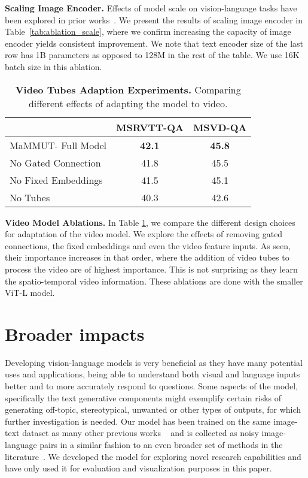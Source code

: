 \documentclass[10pt]{article} \usepackage[accepted]{tmlr}
\newcommand{\tablestyle}[2]{\setlength{\tabcolsep}{#1}\renewcommand{\arraystretch}{#2}\centering\footnotesize}
\newcommand{\ours}{MaMMUT\xspace}
\begin{document}
\textbf{Scaling Image Encoder.}
Effects of model scale on vision-language tasks have been explored in prior works~\citep{flamingo,pali}. We present the results of scaling image encoder in Table~\ref{tab:ablation_scale}, where we confirm increasing the capacity of image encoder yields consistent improvement. We note that text encoder size of the last row has 1B parameters as opposed to 128M in the rest of the table. We use 16K batch size in this ablation.   



\begin{table}
\centering
\small
\tablestyle{8pt}{1.1}
    \begin{tabular}{l|cc}
         & MSRVTT-QA & MSVD-QA \\
         \hline
        \ours - Full Model & \textbf{42.1} & \textbf{45.8} \\
        No Gated Connection & 41.8 & 45.5  \\
        No Fixed Embeddings & 41.5 & 45.1  \\
        No Tubes & 40.3 & 42.6 \\
  \hline
    \end{tabular}
    \vspace{-1mm}
    \caption{\textbf{Video Tubes Adaption Experiments.} Comparing different effects of adapting the model to video. }
    \label{tab:video_ablation}
    \vspace{-1mm}
\end{table}

\textbf{Video Model Ablations.}
In Table \ref{tab:video_ablation}, we compare the different design choices for adaptation of the video model. We explore the effects of removing gated connections, the fixed embeddings and even the video feature inputs. As seen, their importance increases in that order, where the addition of video tubes to process the video are of highest importance. This is not surprising as they learn the spatio-temporal video information. These ablations are done with the smaller ViT-L model. 

\vspace{-2mm}
\section{Broader impacts}
\vspace{-1mm}
Developing vision-language models is very beneficial as they have many potential uses and applications, being able to understand both visual and language inputs better and to more accurately respond to  questions. Some aspects of the model, specifically the text generative components might exemplify certain risks of generating off-topic, stereotypical, unwanted or other types of outputs, for which further investigation is needed.
Our model has been trained on the same image-text dataset as many other previous works ~\citep{align,ScalingViTs,zhai2021lit,yu2022coca,videococa} and is collected as noisy image-language pairs in a similar fashion to an even broader set of methods in the literature~\citep{pali,yuan2021florence,flamingo}. 
We developed the model for exploring novel research capabilities and have only used it for evaluation and visualization purposes in this paper. 
\vspace{-2mm}
\end{document}
